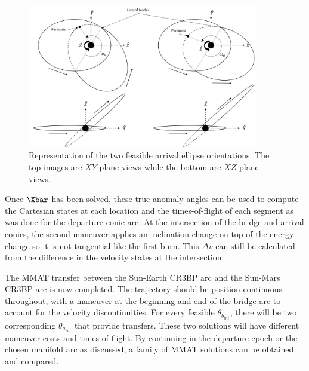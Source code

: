 \begin{figure}[ht]
    \centering
    \includegraphics[width=0.9\textwidth]{figures/orientation.jpg}
    \caption{Representation of the two feasible arrival ellipse orientations. The top images are $XY$-plane views while the bottom are $XZ$-plane views.}
    \label{fig:orientation}
\end{figure}

Once $\Xbar$ has been solved, these true anomaly angles can be used to compute the Cartesian
states at each location and the times-of-flight of each segment as was done for the departure conic
arc. At the intersection of the bridge and arrival conics, the second maneuver applies an
inclination change on top of the energy change so it is not tangential like the first burn. This
$\Delta v$ can still be calculated from the difference in the velocity states at the intersection.

The MMAT transfer between the Sun-Earth CR3BP arc and the Sun-Mars CR3BP arc is now completed. The
trajectory should be position-continuous throughout, with a maneuver at the beginning and end of
the bridge arc to account for the velocity discontinuities. For every feasible $\theta_{b_{int}}$,
there will be two corresponding $\theta_{a_{int}}$ that provide transfers. These two solutions will
have different maneuver costs and times-of-flight. By continuing in the departure epoch or the
chosen manifold arc as discussed, a family of MMAT solutions can be obtained and compared.

